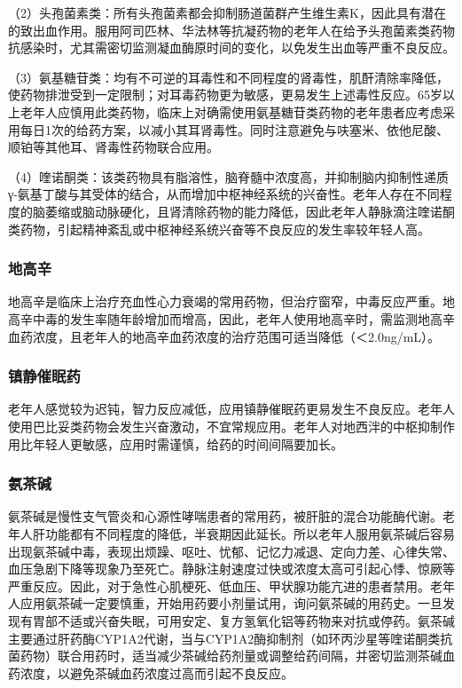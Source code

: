 （2）头孢菌素类：所有头孢菌素都会抑制肠道菌群产生维生素K，因此具有潜在的致出血作用。服用阿司匹林、华法林等抗凝药物的老年人在给予头孢菌素类药物抗感染时，尤其需密切监测凝血酶原时间的变化，以免发生出血等严重不良反应。

（3）氨基糖苷类：均有不可逆的耳毒性和不同程度的肾毒性，肌酐清除率降低，使药物排泄受到一定限制；对耳毒药物更为敏感，更易发生上述毒性反应。65岁以上老年人应慎用此类药物，临床上对确需使用氨基糖苷类药物的老年患者应考虑采用每日1次的给药方案，以减小其耳肾毒性。同时注意避免与呋塞米、依他尼酸、顺铂等其他耳、肾毒性药物联合应用。

（4）喹诺酮类：该类药物具有脂溶性，脑脊髓中浓度高，并抑制脑内抑制性递质γ-氨基丁酸与其受体的结合，从而增加中枢神经系统的兴奋性。老年人存在不同程度的脑萎缩或脑动脉硬化，且肾清除药物的能力降低，因此老年人静脉滴注喹诺酮类药物，引起精神紊乱或中枢神经系统兴奋等不良反应的发生率较年轻人高。

\subsubsection{地高辛}

地高辛是临床上治疗充血性心力衰竭的常用药物，但治疗窗窄，中毒反应严重。地高辛中毒的发生率随年龄增加而增高，因此，老年人使用地高辛时，需监测地高辛血药浓度，且老年人的地高辛血药浓度的治疗范围可适当降低（＜2.0ng/mL）。

\subsubsection{镇静催眠药}

老年人感觉较为迟钝，智力反应减低，应用镇静催眠药更易发生不良反应。老年人使用巴比妥类药物会发生兴奋激动，不宜常规应用。老年人对地西泮的中枢抑制作用比年轻人更敏感，应用时需谨慎，给药的时间间隔要加长。

\subsubsection{氨茶碱}

氨茶碱是慢性支气管炎和心源性哮喘患者的常用药，被肝脏的混合功能酶代谢。老年人肝功能都有不同程度的降低，半衰期因此延长。所以老年人服用氨茶碱后容易出现氨茶碱中毒，表现出烦躁、呕吐、忧郁、记忆力减退、定向力差、心律失常、血压急剧下降等现象乃至死亡。静脉注射速度过快或浓度太高可引起心悸、惊厥等严重反应。因此，对于急性心肌梗死、低血压、甲状腺功能亢进的患者禁用。老年人应用氨茶碱一定要慎重，开始用药要小剂量试用，询问氨茶碱的用药史。一旦发现有胃部不适或兴奋失眠，可用安定、复方氢氧化铝等药物来对抗或停药。氨茶碱主要通过肝药酶CYP1A2代谢，当与CYP1A2酶抑制剂（如环丙沙星等喹诺酮类抗菌药物）联合用药时，适当减少茶碱给药剂量或调整给药间隔，并密切监测茶碱血药浓度，以避免茶碱血药浓度过高而引起不良反应。

